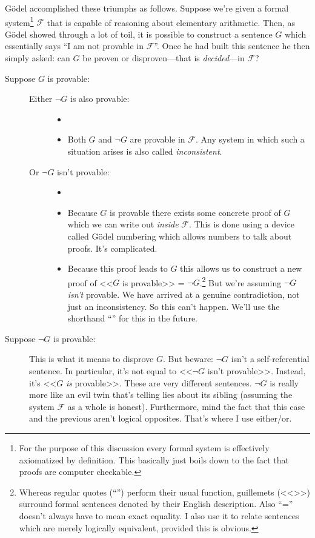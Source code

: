 \documentclass{article}
\theoremstyle{customstyle}
\newcommand{\F}{\ensuremath{\mathcal{F}}}
\begin{document}
Gödel accomplished these triumphs as follows. Suppose we're given a formal system\footnote{For the purpose of this discussion every formal system is effectively axiomatized by definition. This basically just boils down to the fact that proofs are computer checkable.} $\F$ that is capable of reasoning about elementary arithmetic. Then, as Gödel showed through a lot of toil, it is possible to construct a sentence $G$ which essentially says ``I am not provable in $\F$''. Once he had built this sentence he then simply asked: can $G$ be proven or disproven---that is \textit{decided}---in $\F$?

\begin{description}
\item[Suppose $G$ is provable:]
\begin{description}
\item[]
\item[Either $\neg G$ is also provable:]
\begin{itemize}
\item[]
\item Both $G$ and $\neg G$ are provable in $\F$. Any system in which such a situation arises is also called \textit{inconsistent}.
\end{itemize}
\item[Or $\neg G$ isn't provable:]
\begin{itemize}
\item[]
\item Because $G$ is provable there exists some concrete proof of $G$ which we can write out \textit{inside} $\F$. This is done using a device called Gödel numbering which allows numbers to talk about proofs. It's complicated.
\item Because this proof leads to $G$ this allows us to construct a new proof of <<$G$ is provable>> = $\neg G$.\footnote{Whereas regular quotes (``'') perform their usual function, guillemets (<<>>) surround formal sentences denoted by their English description. Also ``='' doesn't always have to mean exact equality. I also use it to relate sentences which are merely logically equivalent, provided this is obvious.} But we're assuming $\neg G$ \textit{isn't} provable. We have arrived at a genuine contradiction, not just an inconsistency. So this can't happen. We'll use the shorthand ``\lightning'' for this in the future.
\end{itemize}
\end{description}
\item[Suppose $\neg G$ is provable:]
This is what it means to disprove $G$. But beware: $\neg G$ isn't a self-referential sentence. In particular, it's not equal to <<$\neg G$ isn't provable>>. Instead, it's <<$G$ \textit{is} provable>>. These are very different sentences. $\neg G$ is really more like an evil twin that's telling lies about its sibling (assuming the system $\F$  as a whole is honest). Furthermore, mind the fact that this case and the previous aren't logical opposites. That's where I use either/or.

\end{description}
\end{document}
